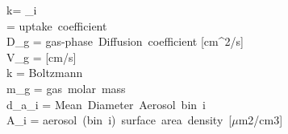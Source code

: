 \mbox{k}= \sum_i   \\
\gamma = \mbox{uptake coefficient} \\
D_g = \mbox{gas-phase Diffusion coefficient} \mbox{[cm}^2\mbox{/s]} \\
V_g =  \;\;\; \mbox{[cm/s]}\\ 
k = \mbox{Boltzmann} \\
m_g = \mbox{gas molar mass} \\
d_{a_i} = \mbox{Mean Diameter Aerosol bin i} \\
A_i = \mbox{aerosol (bin i) surface area density [$\mu$m2/cm3]} 
